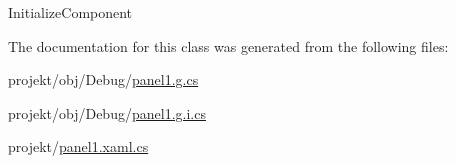 Initialize\+Component 



The documentation for this class was generated from the following files\+:\begin{DoxyCompactItemize}
\item 
projekt/obj/\+Debug/\mbox{\hyperlink{_debug_2panel1_8g_8cs}{panel1.\+g.\+cs}}\item 
projekt/obj/\+Debug/\mbox{\hyperlink{_debug_2panel1_8g_8i_8cs}{panel1.\+g.\+i.\+cs}}\item 
projekt/\mbox{\hyperlink{panel1_8xaml_8cs}{panel1.\+xaml.\+cs}}\end{DoxyCompactItemize}
